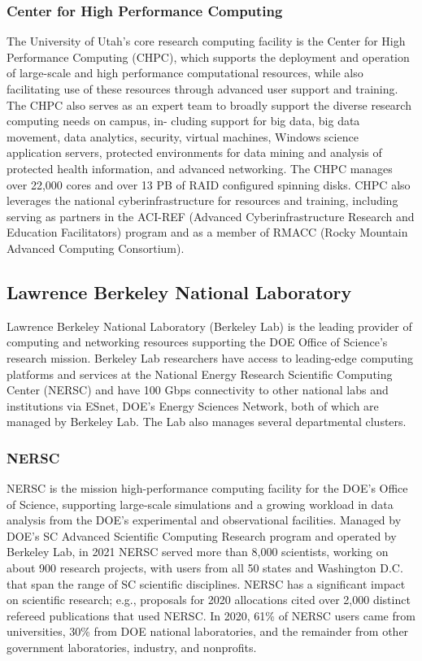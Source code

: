 \subsubsection*{Center for High Performance Computing}
The University of Utah’s core research computing facility is the Center for High Performance Computing (CHPC), which supports the deployment and operation of large-scale and high performance computational resources, while also facilitating use of these resources through advanced user support and training. The CHPC also serves as an expert team to broadly support the diverse research computing needs on campus, in- cluding support for big data, big data movement, data analytics, security, virtual machines, Windows science application servers, protected environments for data mining and analysis of protected health information, and advanced networking. The CHPC manages over 22,000 cores and over 13 PB of RAID configured spinning disks. CHPC also leverages the national cyberinfrastructure for resources and training, including serving as partners in the ACI-REF (Advanced Cyberinfrastructure Research and Education Facilitators) program and as a member of RMACC (Rocky Mountain Advanced Computing Consortium).


\subsection*{Lawrence Berkeley National Laboratory}

Lawrence Berkeley National Laboratory (Berkeley Lab) is the leading provider of computing and networking resources supporting the DOE Office of Science's research mission. Berkeley Lab researchers have access to leading-edge computing platforms and services at the National Energy Research Scientific Computing Center (NERSC) and have 100 Gbps connectivity to other national labs and institutions via ESnet, DOE's Energy Sciences Network, both of which are managed by Berkeley Lab. The Lab also manages several departmental clusters.

\subsubsection*{NERSC}

NERSC is the mission high-performance computing facility for the DOE's Office of Science, supporting large-scale simulations and a growing workload in data analysis from the DOE's experimental and observational facilities. Managed by DOE's SC Advanced Scientific Computing Research program and operated by Berkeley Lab, in 2021 NERSC served more than 8,000 scientists, working on about 900 research projects, with users from all 50 states and Washington D.C. that span the range of SC scientific disciplines. NERSC has a significant impact on scientific research; e.g., proposals for 2020 allocations cited over 2,000 distinct refereed publications that used NERSC\@. In 2020, 61\% of NERSC users came from universities, 30\% from DOE national laboratories, and the remainder from other government laboratories, industry, and nonprofits.

